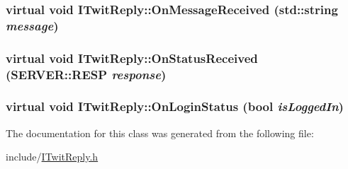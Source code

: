 \hypertarget{classITwitReply_a103f872024b0a36e669b0d82a26a528}{
\subsubsection{\setlength{\rightskip}{0pt plus 5cm}virtual void ITwitReply::OnMessageReceived (std::string {\em message})}}
\label{classITwitReply_a103f872024b0a36e669b0d82a26a528}


\hypertarget{classITwitReply_9011b418bb62f734a2e3cd447815ec90}{
\subsubsection{\setlength{\rightskip}{0pt plus 5cm}virtual void ITwitReply::OnStatusReceived ({\bf SERVER::RESP} {\em response})}}
\label{classITwitReply_9011b418bb62f734a2e3cd447815ec90}


\hypertarget{classITwitReply_691e9bcbe06bd66233b1c870d2e4d67d}{
\subsubsection{\setlength{\rightskip}{0pt plus 5cm}virtual void ITwitReply::OnLoginStatus (bool {\em isLoggedIn})}}
\label{classITwitReply_691e9bcbe06bd66233b1c870d2e4d67d}




The documentation for this class was generated from the following file:\begin{CompactItemize}
\item 
include/\hyperlink{ITwitReply_8h}{ITwitReply.h}\end{CompactItemize}
